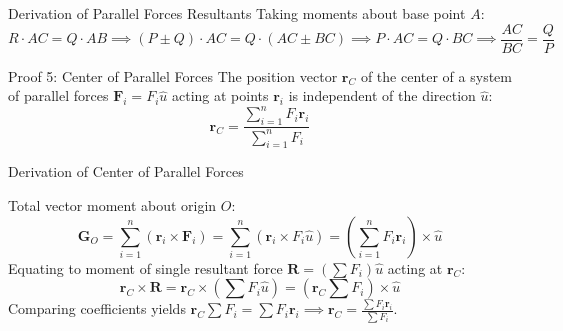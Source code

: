\documentclass[11pt, a4paper]{report}
\begin{document}
\begin{proofbox}{Derivation of Parallel Forces Resultants}
Taking moments about base point $A$:
\[
R \cdot AC = Q \cdot AB \implies (P \pm Q) \cdot AC = Q \cdot (AC \pm BC) \implies P \cdot AC = Q \cdot BC \implies \frac{AC}{BC} = \frac{Q}{P}
\]
\end{proofbox}

\begin{theorembox}{Proof 5: Center of Parallel Forces}
The position vector $\mathbf{r}_C$ of the center of a system of parallel forces $\mathbf{F}_i = F_i \hat{u}$ acting at points $\mathbf{r}_i$ is independent of the direction $\hat{u}$:
\begin{equation}
\mathbf{r}_C = \frac{\sum_{i=1}^n F_i \mathbf{r}_i}{\sum_{i=1}^n F_i}
\end{equation}
\end{theorembox}

\begin{proofbox}{Derivation of Center of Parallel Forces}
\begin{center}
\end{center}

Total vector moment about origin $O$:
\[
\mathbf{G}_O = \sum_{i=1}^n (\mathbf{r}_i \times \mathbf{F}_i) = \sum_{i=1}^n (\mathbf{r}_i \times F_i \hat{u}) = \left( \sum_{i=1}^n F_i \mathbf{r}_i \right) \times \hat{u}
\]
Equating to moment of single resultant force $\mathbf{R} = (\sum F_i)\hat{u}$ acting at $\mathbf{r}_C$:
\[
\mathbf{r}_C \times \mathbf{R} = \mathbf{r}_C \times \left( \sum F_i \hat{u} \right) = \left( \mathbf{r}_C \sum F_i \right) \times \hat{u}
\]
Comparing coefficients yields $\mathbf{r}_C \sum F_i = \sum F_i \mathbf{r}_i \implies \mathbf{r}_C = \frac{\sum F_i \mathbf{r}_i}{\sum F_i}$.
\end{proofbox}
\end{document}
